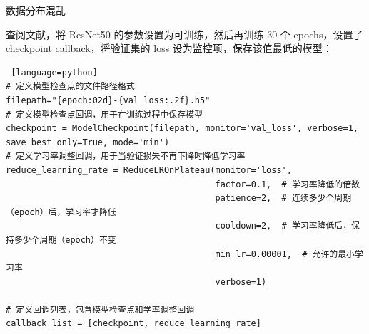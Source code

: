 \documentclass{article}
\begin{document}
数据分布混乱\par
查阅文献，将 ResNet50 的参数设置为可训练，然后再训练 30 个 epochs，设置了 checkpoint callback，将验证集的 loss 设为监控项，保存该值最低的模型：
\begin{lstlisting} [language=python]
# 定义模型检查点的文件路径格式  
filepath="{epoch:02d}-{val_loss:.2f}.h5"  
# 定义模型检查点回调，用于在训练过程中保存模型  
checkpoint = ModelCheckpoint(filepath, monitor='val_loss', verbose=1, save_best_only=True, mode='min')  
# 定义学习率调整回调，用于当验证损失不再下降时降低学习率  
reduce_learning_rate = ReduceLROnPlateau(monitor='loss',  
                                         factor=0.1,  # 学习率降低的倍数  
                                         patience=2,  # 连续多少个周期（epoch）后，学习率才降低  
                                         cooldown=2,  # 学习率降低后，保持多少个周期（epoch）不变  
                                         min_lr=0.00001,  # 允许的最小学习率  
                                         verbose=1)  
  
# 定义回调列表，包含模型检查点和学率调整回调  
callback_list = [checkpoint, reduce_learning_rate]
\end{lstlisting}
\end{document}
